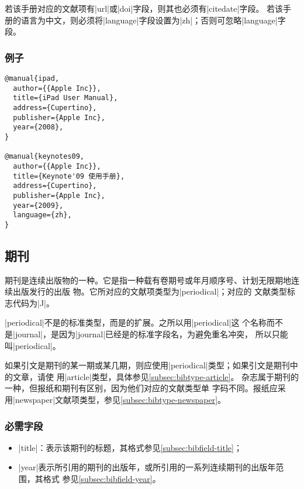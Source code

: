 \begin{note}
若该手册对应的文献项有|url|或|doi|字段，则其也必须有|citedate|字段。
若该手册的语言为中文，则必须将|language|字段设置为|zh|；否则可忽略|language|字段。
\end{note}

\subsubsection{例子}

\begin{verbatim}
@manual{ipad,
  author={{Apple Inc}},
  title={iPad User Manual},
  address={Cupertino},
  publisher={Apple Inc},
  year={2008},
}

@manual{keynotes09,
  author={{Apple Inc}},
  title={Keynote'09 使用手册},
  address={Cupertino},
  publisher={Apple Inc},
  year={2009},
  language={zh},
}
\end{verbatim}


\subsection{期刊}\label{subsec:bibtype-periodical}

期刊是连续出版物的一种。它是指一种载有卷期号或年月顺序号、计划无限期地连续出版发行的出版
物\cite{gbt7714-2005}。它所对应的{\BibTeX}文献项类型为|periodical|；对应的
文献类型标志代码为|J|\cite{gbt3469-1983}。

|periodical|不是{\BibTeX}的标准类型，而是{\njuthesis}的扩展。之所以用|periodical|这
个名称而不是|journal|，是因为|journal|已经是{\BibTeX}的标准字段名，为避免重名冲突，
所以只能叫|periodical|。

\begin{note}
如果引文是期刊的某一期或某几期，则应使用|periodical|类型；如果引文是期刊中的文章，请使
用|article|类型，具体参见\ref{subsec:bibtype-article}。
杂志属于期刊的一种，但报纸和期刊有区别，因为他们对应的文献类型单
字码不同。报纸应采用|newspaper|文献项类型，参见\ref{subsec:bibtype-newspaper}。
\end{note}

\subsubsection{必需字段}

\begin{itemize}
\item |title|：表示该期刊的标题，其格式参见\ref{subsec:bibfield-title}；
\item |year|表示所引用的期刊的出版年，或所引用的一系列连续期刊的出版年范围，其格式
  参见\ref{subsec:bibfield-year}。
\end{itemize}


